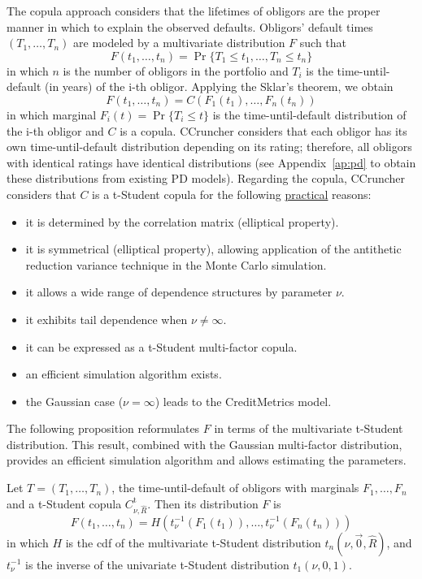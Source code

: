 \documentclass[11pt,fleqn]{book} %
\begin{document}
The copula approach considers that the lifetimes of obligors are the proper 
manner in which to explain the observed defaults. Obligors' default times 
$(T_1,\dots,T_n)$ are modeled by a multivariate distribution $F$ such that
\begin{displaymath}
	F(t_1, \dots, t_n) = \Pr \{T_1 \le t_1, \dots, T_n \le t_n\}
\end{displaymath}
in which $n$ is the number of obligors in the portfolio and $T_i$ is the 
time-until-default (in years) of the i-th obligor. Applying the Sklar's 
theorem, we obtain
\begin{displaymath}
	F(t_1, \dots, t_n) = 
	C\left(F_1(t_1), \dots, F_n(t_n)\right)
\end{displaymath}
in which marginal $F_i(t) = \Pr\{T_i \le t\}$ is the time-until-default 
distribution of the i-th obligor and $C$ is a copula. CCruncher considers that 
each obligor has its own time-until-default distribution depending on its 
rating; therefore, all obligors with identical ratings have identical 
distributions (see Appendix~\ref{ap:pd} to obtain these distributions from 
existing PD models). Regarding the copula, CCruncher considers that $C$ 
is a t-Student copula for the following \ul{practical} reasons:

\begin{itemize}
	\item it is determined by the correlation matrix (elliptical property). 
	\item it is symmetrical (elliptical property), allowing application of the 
	antithetic reduction variance technique in the Monte Carlo simulation.
	\item it allows a wide range of dependence structures by parameter $\nu$.
	\item it exhibits tail dependence when $\nu \ne \infty$.
	\item it can be expressed as a t-Student multi-factor copula.
	\item an efficient simulation algorithm exists.
	\item the Gaussian case ($\nu = \infty$) leads to the 
	CreditMetrics\texttrademark{} model.
\end{itemize}

The following proposition reformulates $F$ in terms of the multivariate 
t-Student distribution. This result, combined with the Gaussian multi-factor 
distribution, provides an efficient simulation algorithm and allows estimating
the parameters.

\begin{proposition}
	\label{prop:dtd}
	Let $T=(T_1,\dots,T_n)$, the time-until-default of obligors with marginals 
	$F_1, \dots, F_n$ and a t-Student copula $C_{\nu,\widehat{R}}^{\text{t}}$. 
	Then its distribution $F$ is
	\begin{displaymath}
		F(t_1,\dots,t_n) = 
		H\left(t_\nu^{-1}(F_1(t_1)), \dots, t_\nu^{-1}(F_n(t_n))\right)
	\end{displaymath}
	in which $H$ is the cdf of the multivariate t-Student distribution 
	$t_n(\nu,\vec{0},\widehat{R})$, and $t_\nu^{-1}$ is the inverse of the 
	univariate t-Student distribution $t_1(\nu,0,1)$.
\end{proposition}
\end{document}
